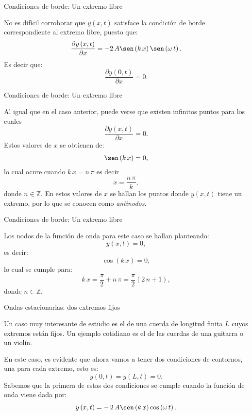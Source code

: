 \documentclass[11pt,handout,aspectratio=1610]{beamer}
\newcommand{\pdiff}[2]{\frac{\partial #1}{\partial #2}}
\newcommand{\zz}{\mathbb{Z}}
\newcommand{\vs}{\vspace{11pt}}
\begin{document}
\begin{frame}{Condiciones de borde: Un extremo libre}

    No es difícil corroborar que $ y \left(x,t\right) $ satisface la condición de borde correspondiente al extremo libre, puesto que: $$ \pdiff{y \left(x,t\right)}{x} = - 2 \, A \sen \left(k \, x\right) \sen \left(\omega \, t\right).  $$ Es decir que: $$ \pdiff{y \left(0,t\right)}{x} = 0. $$ 
        
\end{frame}

\begin{frame}{Condiciones de borde: Un extremo libre}

    Al igual que en el caso anterior, puede verse que existen infinitos puntos para los cuales $$ \pdiff{y \left(x,t\right)}{x} = 0. $$ Estos valores de $x$ se obtienen de: $$ \sen \left(k \, x\right) = 0, $$ lo cual ocure cuando $ k \, x = n \, \pi $ es decir $$ x = \frac{n \, \pi}{k}, $$ donde $n \in \zz $. En estos valores de $x$ se hallan los puntos donde $ y \left(x,t\right) $ tiene un extremo, por lo que se conocen como \emph{antinodos}.
        
\end{frame}

\begin{frame}{Condiciones de borde: Un extremo libre}

    Los nodos de la función de onda para este caso se hallan planteando: $$ y \left(x,t\right) = 0, $$ es decir: $$ \cos \left(k \, x\right) = 0, $$ lo cual se cumple para: $$ k \, x = \frac{\pi}{2} + n \, \pi = \frac{\pi}{2} \left( 2 \, n + 1\right), $$ donde $n \in \zz $.

\end{frame}

\begin{frame}{Ondas estacionarias: dos extremos fijos}

    Un caso muy interesante de estudio es el de una cuerda de longitud finita $L$ cuyos extremos están fijos. Un ejemplo cotidiano es el de las cuerdas de una guitarra o un violín.

    \vs 

    En este caso, es evidente que ahora vamos a tener dos condiciones de contornos, una para cada extremo, esto es: $$ y \left(0,t\right) = y \left(L,t\right) = 0. $$ Sabemos que la primera de estas dos condiciones se cumple cuando la función de onda viene dada por: $$ y \left(x,t\right) = - \, 2 \, A \sen \left(k \, x\right) \cos \left(\omega \, t\right). $$ 
 
\end{frame}
\end{document}
